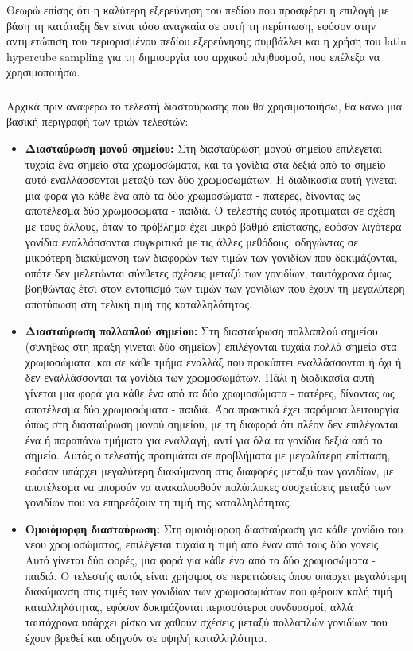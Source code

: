 \documentclass[12pt,a4paper]{article}
\begin{document}
Θεωρώ επίσης ότι η καλύτερη εξερεύνηση του πεδίου που προσφέρει η επιλογή με βάση τη κατάταξη δεν είναι τόσο αναγκαία σε αυτή τη περίπτωση, εφόσον στην αντιμετώπιση του περιορισμένου πεδίου εξερεύνησης συμβάλλει και η χρήση του latin hypercube sampling για τη δημιουργία του αρχικού πληθυσμού, που επέλεξα να χρησιμοποιήσω.

\subsubsection{}

Αρχικά πριν αναφέρω το τελεστή διασταύρωσης που θα χρησιμοποιήσω, θα κάνω μια βασική περιγραφή των τριών τελεστών:

\begin{itemize}
    \item \textbf{Διασταύρωση μονού σημείου:} Στη διασταύρωση μονού σημείου επιλέγεται τυχαία ένα σημείο στα χρωμοσώματα, και τα γονίδια στα δεξιά από το σημείο αυτό εναλλάσσονται μεταξύ των δύο χρωμοσωμάτων. Η διαδικασία αυτή γίνεται μια φορά για κάθε ένα από τα δύο χρωμοσώματα - πατέρες, δίνοντας ως αποτέλεσμα δύο χρωμοσώματα - παιδιά. Ο τελεστής αυτός προτιμάται σε σχέση με τους άλλους, όταν το πρόβλημα έχει μικρό βαθμό επίστασης, εφόσον λιγότερα γονίδια εναλλάσσονται συγκριτικά με τις άλλες μεθόδους, οδηγώντας σε μικρότερη διακύμανση των διαφορών των τιμών των γονιδίων που δοκιμάζονται, οπότε δεν μελετώνται σύνθετες σχέσεις μεταξύ των γονιδίων, ταυτόχρονα όμως βοηθώντας έτσι στον εντοπισμό των τιμών των γονιδίων που έχουν τη μεγαλύτερη αποτύπωση στη τελική τιμή της καταλληλότητας.
    \item \textbf{Διασταύρωση πολλαπλού σημείου:} Στη διασταύρωση πολλαπλού σημείου (συνήθως στη πράξη γίνεται δύο σημείων) επιλέγονται τυχαία πολλά σημεία στα χρωμοσώματα, και σε κάθε τμήμα εναλλάξ που προκύπτει εναλλάσσονται ή όχι ή δεν εναλλάσσονται τα γονίδια των χρωμοσωμάτων. Πάλι η διαδικασία αυτή γίνεται μια φορά για κάθε ένα από τα δύο χρωμοσώματα - πατέρες, δίνοντας ως αποτέλεσμα δύο χρωμοσώματα - παιδιά. Άρα πρακτικά έχει παρόμοια λειτουργία όπως στη διασταύρωση μονού σημείου, με τη διαφορά ότι πλέον δεν επιλέγονται ένα ή παραπάνω τμήματα για εναλλαγή, αντί για όλα τα γονίδια δεξιά από το σημείο. Αυτός ο τελεστής προτιμάται σε προβλήματα με μεγαλύτερη επίσταση, εφόσον υπάρχει μεγαλύτερη διακύμανση στις διαφορές μεταξύ των γονιδίων, με αποτέλεσμα να μπορούν να ανακαλυφθούν πολύπλοκες συσχετίσεις μεταξύ των γονιδίων που να επηρεάζουν τη τιμή της καταλληλότητας.
    \item \textbf{Ομοιόμορφη διασταύρωση:} Στη ομοιόμορφη διασταύρωση για κάθε γονίδιο του νέου χρωμοσώματος, επιλέγεται τυχαία η τιμή από έναν από τους δύο γονείς. Αυτό γίνεται δύο φορές, μια φορά για κάθε ένα από τα δύο χρωμοσώματα - παιδιά. Ο τελεστής αυτός είναι χρήσιμος σε περιπτώσεις όπου υπάρχει μεγαλύτερη διακύμανση στις τιμές των γονιδίων των χρωμοσωμάτων που φέρουν καλή τιμή καταλληλότητας, εφόσον δοκιμάζονται περισσότεροι συνδυασμοί, αλλά ταυτόχρονα υπάρχει ρίσκο να χαθούν σχέσεις μεταξύ πολλαπλών γονιδίων που έχουν βρεθεί και οδηγούν σε υψηλή καταλληλότητα.
\end{itemize}
\end{document}
